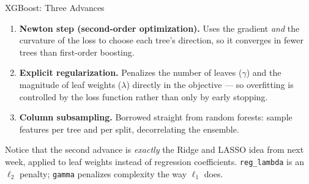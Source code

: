 \documentclass[aspectratio=169, 11pt]{beamer}
\begin{document}
\begin{frame}{XGBoost: Three Advances \parencite{Chen2016}}
  \begin{enumerate}\itemsep2pt
    \item \textbf{Newton step (second-order optimization).} Uses the gradient \emph{and} the
          curvature of the loss to choose each tree's direction, so it converges in fewer
          trees than first-order boosting.
    \item \textbf{Explicit regularization.} Penalizes the number of leaves ($\gamma$) and the
          magnitude of leaf weights ($\lambda$) directly in the objective --- so overfitting
          is controlled by the loss function rather than only by early stopping.
    \item \textbf{Column subsampling.} Borrowed straight from random forests: sample features
          per tree and per split, decorrelating the ensemble.
  \end{enumerate}

  \vspace{0.15cm}
  Notice that the second advance is \emph{exactly} the Ridge and LASSO idea from next week,
  applied to leaf weights instead of regression coefficients. \texttt{reg\_lambda} is an
  $\ell_2$ penalty; \texttt{gamma} penalizes complexity the way $\ell_1$ does.

  \vspace{0.15cm}
\end{frame}
\end{document}
